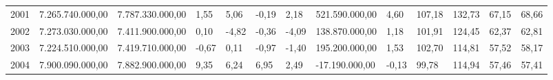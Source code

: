 \documentclass[a4paper,openright,12pt]{book}
\begin{document}
\begin{table}
{\begin{tabular}{lllllllllllll}
    2001 & 7.265.740.000,00                     & 7.787.330.000,00                     & 1,55                                          & 5,06                                          & -0,19                                      & 2,18                                       & 521.590.000,00        & 4,60                     & 107,18                 & 132,73                & 67,15                                 & 68,66                  \\
    2002 & 7.273.030.000,00                     & 7.411.900.000,00                     & 0,10                                          & -4,82                                         & -0,36                                      & -4,09                                      & 138.870.000,00        & 1,18                     & 101,91                 & 124,45                & 62,37                                 & 62,81                  \\
    2003 & 7.224.510.000,00                     & 7.419.710.000,00                     & -0,67                                         & 0,11                                          & -0,97                                      & -1,40                                      & 195.200.000,00        & 1,53                     & 102,70                 & 114,81                & 57,52                                 & 58,17                  \\
    2004 & 7.900.090.000,00                     & 7.882.900.000,00                     & 9,35                                          & 6,24                                          & 6,95                                       & 2,49                                       & -17.190.000,00        & -0,13                    & 99,78                  & 114,94                & 57,46                                 & 57,41                  \\


\end{tabular}}
\end{table}
\end{document}
